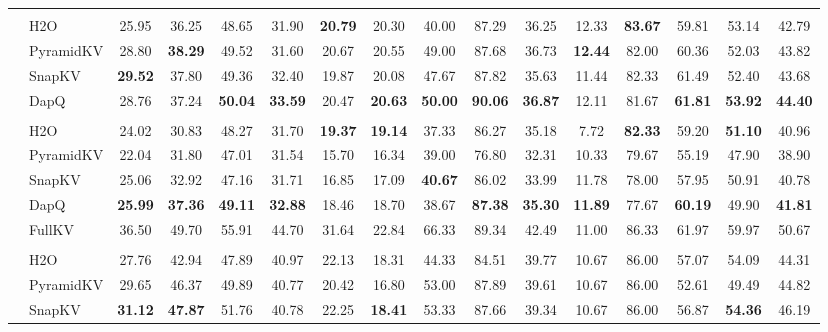 \begin{table}[t]
{\begin{tabular}{>{\bfseries}c >{\raggedright}p{1.2cm} *{14}{c}}
& \multicolumn{15}{c}{\cellcolor{gray!20}\textbf{KV Cache Size = 128}} \\
& H2O & 25.95 & 36.25 & 48.65 & 31.90 & \textbf{20.79} & 20.30 & 40.00 & 87.29 & 36.25 & 12.33 & \textbf{83.67} & 59.81 & 53.14 & 42.79 \\
& PyramidKV & 28.80 & \textbf{38.29} & 49.52 & 31.60 & 20.67 & 20.55 & 49.00 & 87.68 & 36.73 & \textbf{12.44} & 82.00 & 60.36 & 52.03 & 43.82 \\
& SnapKV & \textbf{29.52} & 37.80 & 49.36 & 32.40 & 19.87 & 20.08 & 47.67 & 87.82 & 35.63 & 11.44 & 82.33 & 61.49 & 52.40 & 43.68 \\
& DapQ & 28.76 & 37.24 & \textbf{50.04} & \textbf{33.59} & 20.47 & \textbf{20.63} & \textbf{50.00} & \textbf{90.06} & \textbf{36.87} & 12.11 & 81.67 & \textbf{61.81} & \textbf{53.92} & \textbf{44.40} \\
& \multicolumn{15}{c}{\cellcolor{gray!20}\textbf{KV Cache Size = 64}} \\
& H2O & 24.02 & 30.83 & 48.27 & 31.70 & \textbf{19.37} & \textbf{19.14} & 37.33 & 86.27 & 35.18 & 7.72 & \textbf{82.33} & 59.20 & \textbf{51.10} & 40.96 \\
& PyramidKV & 22.04 & 31.80 & 47.01 & 31.54 & 15.70 & 16.34 & 39.00 & 76.80 & 32.31 & 10.33 & 79.67 & 55.19 & 47.90 & 38.90 \\
& SnapKV & 25.06 & 32.92 & 47.16 & 31.71 & 16.85 & 17.09 & \textbf{40.67} & 86.02 & 33.99 & 11.78 & 78.00 & 57.95 & 50.91 & 40.78 \\
& DapQ & \textbf{25.99} & \textbf{37.36} & \textbf{49.11} & \textbf{32.88} & 18.46 & 18.70 & 38.67 & \textbf{87.38} & \textbf{35.30} & \textbf{11.89} & 77.67 & \textbf{60.19} & 49.90 & \textbf{41.81} \\
\midrule
& FullKV & 36.50 & 49.70 & 55.91 & 44.70 & 31.64 & 22.84 & 66.33 & 89.34 & 42.49 & 11.00 & 86.33 & 61.97 & 59.97 & 50.67 \\
& \multicolumn{15}{c}{\cellcolor{gray!20}\textbf{KV Cache Size = 256}} \\
\multirow{12}{*}{\rotatebox{90}{Qwen2.5-7B-Instruct}} & H2O & 27.76 & 42.94 & 47.89 & 40.97 & 22.13 & 18.31 & 44.33 & 84.51 & 39.77 & 10.67 & 86.00 & 57.07 & 54.09 & 44.31 \\
& PyramidKV & 29.65 & 46.37 & 49.89 & 40.77 & 20.42 & 16.80 & 53.00 & 87.89 & 39.61 & 10.67 & 86.00 & 52.61 & 49.49 & 44.82 \\
& SnapKV & \textbf{31.12} & \textbf{47.87} & 51.76 & 40.78 & 22.25 & \textbf{18.41} & 53.33 & 87.66 & 39.34 & 10.67 & 86.00 & 56.87 & \textbf{54.36} & 46.19 \\

\end{tabular}}
\end{table}
